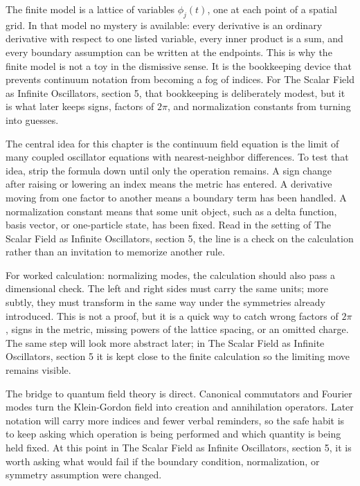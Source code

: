 The finite model is a lattice of variables \(\phi_j(t)\), one at each point of a spatial grid.  In that model no mystery is available: every derivative is an ordinary derivative with respect to one listed variable, every inner product is a sum, and every boundary assumption can be written at the endpoints.  This is why the finite model is not a toy in the dismissive sense.  It is the bookkeeping device that prevents continuum notation from becoming a fog of indices.  For The Scalar Field as Infinite Oscillators, section 5, that bookkeeping is deliberately modest, but it is what later keeps signs, factors of \(2\pi\), and normalization constants from turning into guesses.

The central idea for this chapter is the continuum field equation is the limit of many coupled oscillator equations with nearest-neighbor differences.  To test that idea, strip the formula down until only the operation remains.  A sign change after raising or lowering an index means the metric has entered.  A derivative moving from one factor to another means a boundary term has been handled.  A normalization constant means that some unit object, such as a delta function, basis vector, or one-particle state, has been fixed.  Read in the setting of The Scalar Field as Infinite Oscillators, section 5, the line is a check on the calculation rather than an invitation to memorize another rule.

For worked calculation: normalizing modes, the calculation should also pass a dimensional check.  The left and right sides must carry the same units; more subtly, they must transform in the same way under the symmetries already introduced.  This is not a proof, but it is a quick way to catch wrong factors of \(2\pi\), signs in the metric, missing powers of the lattice spacing, or an omitted charge.  The same step will look more abstract later; in The Scalar Field as Infinite Oscillators, section 5 it is kept close to the finite calculation so the limiting move remains visible.

The bridge to quantum field theory is direct.  Canonical commutators and Fourier modes turn the Klein-Gordon field into creation and annihilation operators.  Later notation will carry more indices and fewer verbal reminders, so the safe habit is to keep asking which operation is being performed and which quantity is being held fixed.  At this point in The Scalar Field as Infinite Oscillators, section 5, it is worth asking what would fail if the boundary condition, normalization, or symmetry assumption were changed.

